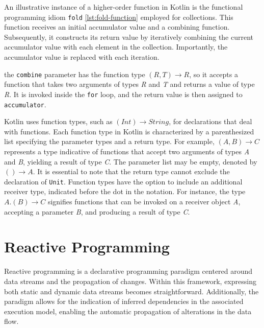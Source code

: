 \documentclass[12pt,a4paper,openright,twoside]{book}
\begin{document}
An illustrative instance of a higher-order function in Kotlin is the functional programming idiom \texttt{fold}
\cref{lst:fold-function} 
employed for collections. This function receives an initial accumulator value and a combining function. Subsequently, it constructs its return value by iteratively combining the current accumulator value with each element in the collection. Importantly, the accumulator value is replaced with each iteration.



the \texttt{combine} parameter has the function type \((R, T) \rightarrow R\), so it accepts a function that takes two arguments of types \textit{R} and \textit{T} and returns a value of type \textit{R}. It is invoked inside the \texttt{for} loop, and the return value is then assigned to \texttt{accumulator}.

Kotlin uses function types, such as \((Int) \rightarrow String\), for declarations that deal with functions. Each function type in Kotlin is characterized by a parenthesized list specifying the parameter types and a return type. For example, \((A, B) \rightarrow C\) represents a type indicative of functions that accept two arguments of types \textit{A} and \textit{B}, yielding a result of type \textit{C}. The parameter list may be empty, denoted by \(() \rightarrow A\). It is essential to note that the return type cannot exclude the declaration of \texttt{Unit}. Function types have the option to include an additional receiver type, indicated before the dot in the notation. For instance, the type \(A.(B) \rightarrow C\) signifies functions that can be invoked on a receiver object \textit{A}, accepting a parameter \textit{B}, and producing a result of type \textit{C}.

\section{Reactive Programming}

Reactive programming is a declarative programming paradigm centered around data streams and the propagation of changes. Within this framework, expressing both static and dynamic data streams becomes straightforward. Additionally, the paradigm allows for the indication of inferred dependencies in the associated execution model, enabling the automatic propagation of alterations in the data flow.
\end{document}

